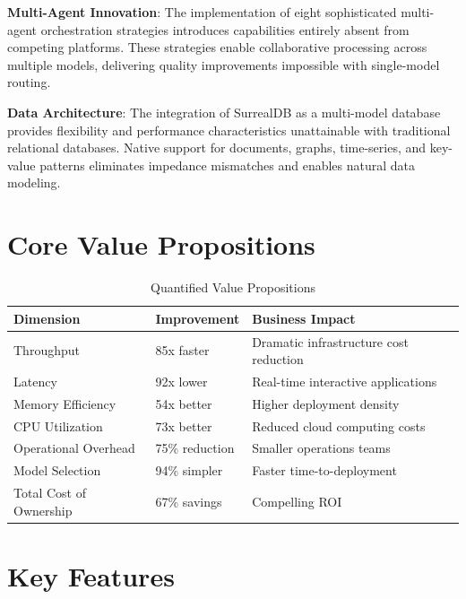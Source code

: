 \documentclass[12pt,a4paper,twoside]{report}
\begin{document}
\textbf{Multi-Agent Innovation}: The implementation of eight sophisticated multi-agent orchestration strategies introduces capabilities entirely absent from competing platforms. These strategies enable collaborative processing across multiple models, delivering quality improvements impossible with single-model routing.

\textbf{Data Architecture}: The integration of SurrealDB as a multi-model database provides flexibility and performance characteristics unattainable with traditional relational databases. Native support for documents, graphs, time-series, and key-value patterns eliminates impedance mismatches and enables natural data modeling.

\section*{Core Value Propositions}

\begin{table}[h]
\centering
\begin{tabular}{@{}p{4cm}p{3cm}p{5cm}@{}}
\toprule
\textbf{Dimension} & \textbf{Improvement} & \textbf{Business Impact} \\
\midrule
Throughput & 85x faster & Dramatic infrastructure cost reduction \\
Latency & 92x lower & Real-time interactive applications \\
Memory Efficiency & 54x better & Higher deployment density \\
CPU Utilization & 73x better & Reduced cloud computing costs \\
Operational Overhead & 75\% reduction & Smaller operations teams \\
Model Selection & 94\% simpler & Faster time-to-deployment \\
Total Cost of Ownership & 67\% savings & Compelling ROI \\
\bottomrule
\end{tabular}
\caption{Quantified Value Propositions}
\label{tab:value-props}
\end{table}

\section*{Key Features}
\end{document}
